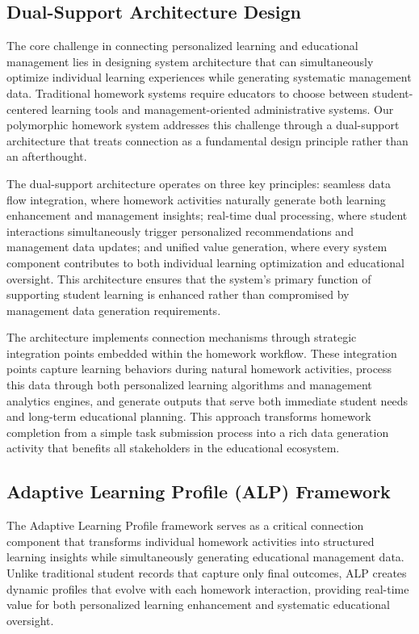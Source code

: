 \documentclass[conference]{IEEEtran}
\begin{document}
\begin{IEEEkeywords}
\subsection{Dual-Support Architecture Design}

The core challenge in connecting personalized learning and educational management lies in designing system architecture that can simultaneously optimize individual learning experiences while generating systematic management data. Traditional homework systems require educators to choose between student-centered learning tools and management-oriented administrative systems. Our polymorphic homework system addresses this challenge through a dual-support architecture that treats connection as a fundamental design principle rather than an afterthought.

The dual-support architecture operates on three key principles: seamless data flow integration, where homework activities naturally generate both learning enhancement and management insights; real-time dual processing, where student interactions simultaneously trigger personalized recommendations and management data updates; and unified value generation, where every system component contributes to both individual learning optimization and educational oversight. This architecture ensures that the system's primary function of supporting student learning is enhanced rather than compromised by management data generation requirements.

The architecture implements connection mechanisms through strategic integration points embedded within the homework workflow. These integration points capture learning behaviors during natural homework activities, process this data through both personalized learning algorithms and management analytics engines, and generate outputs that serve both immediate student needs and long-term educational planning. This approach transforms homework completion from a simple task submission process into a rich data generation activity that benefits all stakeholders in the educational ecosystem.

\subsection{Adaptive Learning Profile (ALP) Framework}

The Adaptive Learning Profile framework serves as a critical connection component that transforms individual homework activities into structured learning insights while simultaneously generating educational management data. Unlike traditional student records that capture only final outcomes, ALP creates dynamic profiles that evolve with each homework interaction, providing real-time value for both personalized learning enhancement and systematic educational oversight.


\end{IEEEkeywords}
\end{document}
